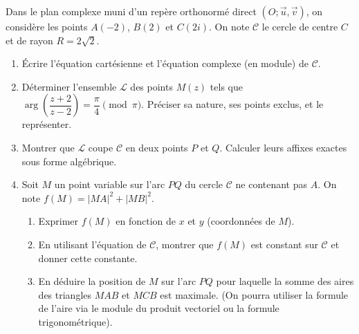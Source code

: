 \documentclass[11pt]{article}
\begin{document}
\begin{exercice}
Dans le plan complexe muni d'un repère orthonormé direct $(O; \vec{u}, \vec{v})$, on considère les points $A(-2)$, $B(2)$ et $C(2i)$. On note $\mathcal{C}$ le cercle de centre $C$ et de rayon $R = 2\sqrt{2}$.
\begin{enumerate}
    \item Écrire l'équation cartésienne et l'équation complexe (en module) de $\mathcal{C}$.
    \item Déterminer l'ensemble $\mathcal{L}$ des points $M(z)$ tels que $\arg\left(\dfrac{z+2}{z-2}\right) = \dfrac{\pi}{4} \pmod{\pi}$. Préciser sa nature, ses points exclus, et le représenter.
    \item Montrer que $\mathcal{L}$ coupe $\mathcal{C}$ en deux points $P$ et $Q$. Calculer leurs affixes exactes sous forme algébrique.
    \item Soit $M$ un point variable sur l'arc $PQ$ du cercle $\mathcal{C}$ ne contenant pas $A$. On note $f(M) = |MA|^2 + |MB|^2$.
    \begin{enumerate}
        \item Exprimer $f(M)$ en fonction de $x$ et $y$ (coordonnées de $M$).
        \item En utilisant l'équation de $\mathcal{C}$, montrer que $f(M)$ est constant sur $\mathcal{C}$ et donner cette constante.
        \item En déduire la position de $M$ sur l'arc $PQ$ pour laquelle la somme des aires des triangles $MAB$ et $MCB$ est maximale. (On pourra utiliser la formule de l'aire via le module du produit vectoriel ou la formule trigonométrique).
    \end{enumerate}
\end{enumerate}
\end{exercice}
\end{document}
